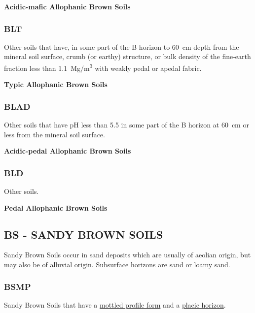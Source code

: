 \documentclass[
  letterpaper,
  DIV=11,
  numbers=noendperiod]{scrreprt}
\begin{document}
\textbf{Acidic-mafic Allophanic Brown Soils}

\hypertarget{sec-key-BLT}{%
\subsubsection{\texorpdfstring{\textbf{BLT}}{BLT}}\label{sec-key-BLT}}

Other soils that have, in some part of the B horizon to 60~cm depth from
the mineral soil surface, crumb (or earthy) structure, or bulk density
of the fine-earth fraction less than 1.1~Mg/m\textsuperscript{3} with
weakly pedal or apedal fabric.

\textbf{Typic Allophanic Brown Soils}

\hypertarget{sec-key-BLAD}{%
\subsubsection{\texorpdfstring{\textbf{BLAD}}{BLAD}}\label{sec-key-BLAD}}

Other soils that have pH less than 5.5 in some part of the B horizon at
60~cm or less from the mineral soil surface.

\textbf{Acidic-pedal Allophanic Brown Soils}

\hypertarget{sec-key-BLD}{%
\subsubsection{\texorpdfstring{\textbf{BLD}}{BLD}}\label{sec-key-BLD}}

Other soils.

\textbf{Pedal Allophanic Brown Soils}

\hypertarget{sec-BS}{%
\subsection{\texorpdfstring{\textbf{BS} - SANDY BROWN
SOILS}{BS - SANDY BROWN SOILS}}\label{sec-BS}}

Sandy Brown Soils occur in sand deposits which are usually of aeolian
origin, but may also be of alluvial origin. Subsurface horizons are sand
or loamy sand.

\hypertarget{sec-key-BSMP}{%
\subsubsection{\texorpdfstring{\textbf{BSMP}}{BSMP}}\label{sec-key-BSMP}}

Sandy Brown Soils that have a
\protect\hyperlink{sec-diag-mottpf}{mottled profile form} and a
\protect\hyperlink{sec-diag-plac}{placic horizon}.
\end{document}

